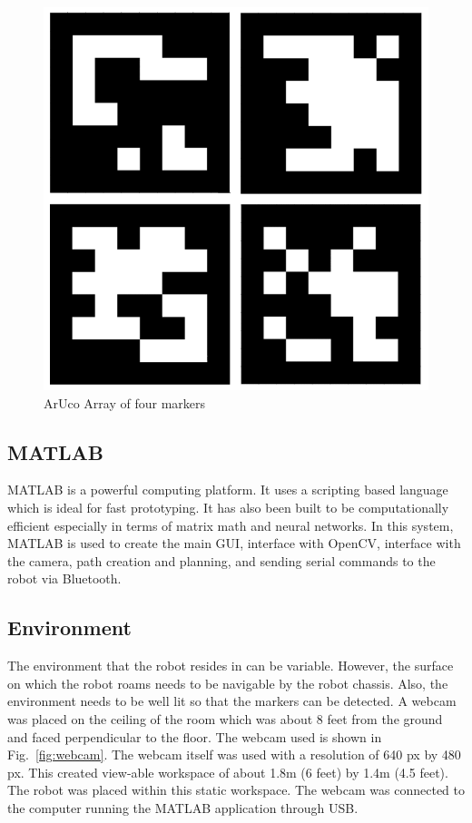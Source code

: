 \documentclass[12pt,american]{report}
\begin{document}
\begin{figure}[h!]
\centering
\includegraphics[scale=.45]{images/ArucoArray.PNG}
\caption{ArUco Array of four markers}
\label{fig:ArUco}
\end{figure}

\subsection{MATLAB}

MATLAB is a powerful computing platform.  It uses a scripting based language which is ideal for fast prototyping.  It has also been built to be computationally efficient especially in terms of matrix math and neural networks. In this system, MATLAB is used to create the main GUI, interface with OpenCV, interface with the camera, path creation and planning, and sending serial commands to the robot via Bluetooth.  

\subsection{Environment}

The environment that the robot resides in can be variable.  However, the surface on which the robot roams needs to be navigable by the robot chassis. Also, the environment needs to be well lit so that the markers can be detected. A webcam was placed on the ceiling of the room which was about 8 feet from the ground and faced perpendicular to the floor. The webcam used is shown in Fig.~\ref{fig:webcam}. The webcam itself was used with a resolution of 640 px by 480 px.  This created view-able workspace of about 1.8m (6 feet) by 1.4m (4.5 feet). The robot was placed within this static workspace. The webcam was connected to the computer running the MATLAB application through USB.
\end{document}
